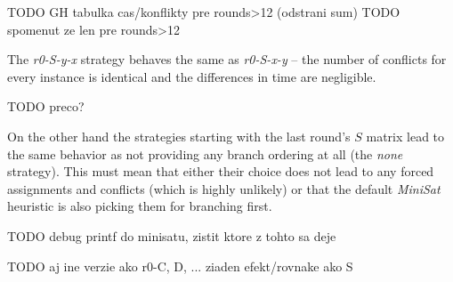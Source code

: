 TODO GH tabulka cas/konflikty pre rounds>12 (odstrani sum)
TODO spomenut ze len pre rounds>12

The \emph{r0-S-y-x} strategy behaves the same as \emph{r0-S-x-y} -- the number of conflicts for every instance is identical and the differences in time are negligible.

TODO preco?

On the other hand the strategies starting with the last round's $S$ matrix lead to the same behavior as not providing any branch ordering at all (the \emph{none} strategy).
This must mean that either their choice does not lead to any forced assignments and conflicts (which is highly unlikely) or that the default \emph{MiniSat} heuristic is also picking them for branching first.

TODO debug printf do minisatu, zistit ktore z tohto sa deje

TODO aj ine verzie ako r0-C, D, ... ziaden efekt/rovnake ako S
	

